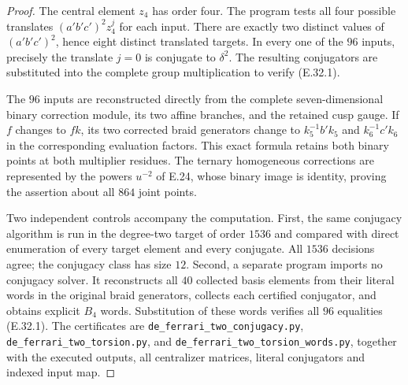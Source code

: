 \begin{proof}
The central element $z_4$ has order four. The program tests all
four possible translates $(a'b'c')^2z_4^j$ for each input.
There are exactly two distinct values of $(a'b'c')^2$, hence
eight distinct translated targets. In every one of the
$96$ inputs, precisely the translate $j=0$ is conjugate to
$\delta^2$. The resulting conjugators are substituted into
the complete group multiplication to verify (E.32.1).

The $96$ inputs are reconstructed directly from the complete
seven-dimensional binary correction module, its two affine
branches, and the retained cusp gauge. If $f$ changes to $fk$,
its two corrected braid generators change to
$k_5^{-1}b'k_5$ and $k_6^{-1}c'k_6$ in the corresponding
evaluation factors. This exact formula retains both binary
points at both multiplier residues. The ternary homogeneous
corrections are represented by the powers $u^{-2}$ of E.24,
whose binary image is identity, proving the assertion about
all $864$ joint points.

Two independent controls accompany the computation.
First, the same conjugacy algorithm is run in the
degree-two target of order $1536$ and compared with direct
enumeration of every target element and every conjugate.
All $1536$ decisions agree; the conjugacy class has size
$12$. Second, a separate program imports no conjugacy
solver. It reconstructs all $40$ collected basis elements
from their literal words in the original braid generators,
collects each certified conjugator, and obtains explicit
$B_4$ words. Substitution of these words verifies all $96$
equalities (E.32.1). The certificates are
\texttt{de\_ferrari\_two\_conjugacy.py},
\texttt{de\_ferrari\_two\_torsion.py}, and
\texttt{de\_ferrari\_two\_torsion\_words.py}, together
with the executed outputs, all centralizer matrices,
literal conjugators and indexed input map.
\end{proof}
